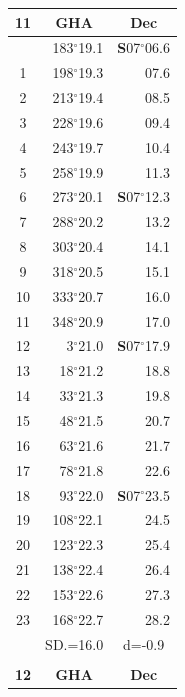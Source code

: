 \documentclass[10pt, a4paper]{report}
\begin{document}
\begin{scriptsize}
\begin{tabular*}{0.2\textwidth}[t]{@{\extracolsep{\fill}}|c|rr|}
\hline
\multicolumn{1}{|c|}{\rule{0pt}{2.6ex}\textbf{11}} & \multicolumn{1}{c}{\textbf{GHA}} & \multicolumn{1}{c|}{\textbf{Dec}}\\
\hline\rule{0pt}{2.6ex}\noindent
0 & 183$^\circ$19.1 & \textbf{S}07$^\circ$06.6\\
1 & 198$^\circ$19.3 & 07.6\\
2 & 213$^\circ$19.4 & 08.5\\
3 & 228$^\circ$19.6 & \raisebox{0.24ex}{\boldmath$\cdot$~\boldmath$\cdot$~~}09.4\\
4 & 243$^\circ$19.7 & 10.4\\
5 & 258$^\circ$19.9 & 11.3\\[2Pt]
6 & 273$^\circ$20.1 & \textbf{S}07$^\circ$12.3\\
7 & 288$^\circ$20.2 & 13.2\\
8 & 303$^\circ$20.4 & 14.1\\
9 & 318$^\circ$20.5 & \raisebox{0.24ex}{\boldmath$\cdot$~\boldmath$\cdot$~~}15.1\\
10 & 333$^\circ$20.7 & 16.0\\
11 & 348$^\circ$20.9 & 17.0\\[2Pt]
12 & 3$^\circ$21.0 & \textbf{S}07$^\circ$17.9\\
13 & 18$^\circ$21.2 & 18.8\\
14 & 33$^\circ$21.3 & 19.8\\
15 & 48$^\circ$21.5 & \raisebox{0.24ex}{\boldmath$\cdot$~\boldmath$\cdot$~~}20.7\\
16 & 63$^\circ$21.6 & 21.7\\
17 & 78$^\circ$21.8 & 22.6\\[2Pt]
18 & 93$^\circ$22.0 & \textbf{S}07$^\circ$23.5\\
19 & 108$^\circ$22.1 & 24.5\\
20 & 123$^\circ$22.3 & 25.4\\
21 & 138$^\circ$22.4 & \raisebox{0.24ex}{\boldmath$\cdot$~\boldmath$\cdot$~~}26.4\\
22 & 153$^\circ$22.6 & 27.3\\
23 & 168$^\circ$22.7 & 28.2\\
\hline
\rule{0pt}{2.4ex} & \multicolumn{1}{c}{SD.=16.0} & \multicolumn{1}{c|}{d=-0.9}\\
\hline
\multicolumn{1}{c}{}\\[-0.5ex]\hline
\multicolumn{1}{|c|}{\rule{0pt}{2.6ex}\textbf{12}} & \multicolumn{1}{c}{\textbf{GHA}} & \multicolumn{1}{c|}{\textbf{Dec}}\\

\end{tabular*}
\end{scriptsize}
\end{document}
